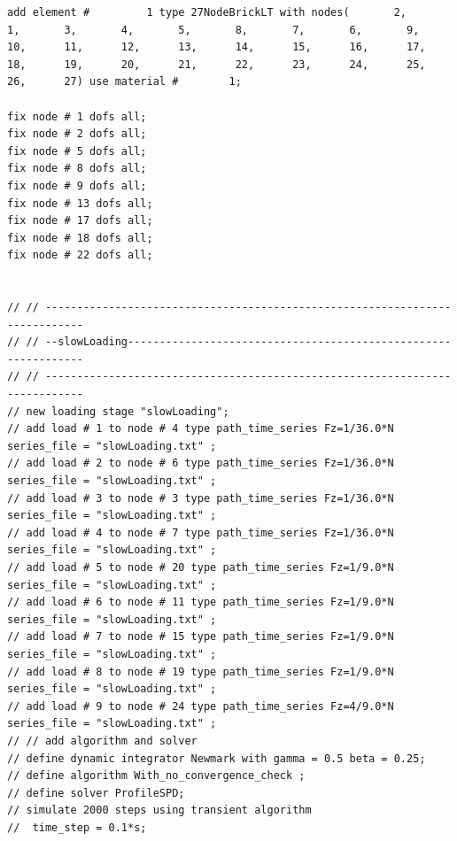 \documentclass[fleqn,11pt]{article}
\begin{document}
\begin{lstlisting}
add element #         1 type 27NodeBrickLT with nodes(       2,       1,       3,       4,       5,       8,       7,       6,       9,      10,      11,      12,      13,      14,      15,      16,      17,      18,      19,      20,      21,      22,      23,      24,      25,      26,      27) use material #        1; 

fix node # 1 dofs all;
fix node # 2 dofs all;
fix node # 5 dofs all;
fix node # 8 dofs all;
fix node # 9 dofs all;
fix node # 13 dofs all;
fix node # 17 dofs all;
fix node # 18 dofs all;
fix node # 22 dofs all;

  
// // ----------------------------------------------------------------------------
// // --slowLoading---------------------------------------------------------------
// // ----------------------------------------------------------------------------
// new loading stage "slowLoading";
// add load # 1 to node # 4 type path_time_series Fz=1/36.0*N series_file = "slowLoading.txt" ; 
// add load # 2 to node # 6 type path_time_series Fz=1/36.0*N series_file = "slowLoading.txt" ; 
// add load # 3 to node # 3 type path_time_series Fz=1/36.0*N series_file = "slowLoading.txt" ; 
// add load # 4 to node # 7 type path_time_series Fz=1/36.0*N series_file = "slowLoading.txt" ; 
// add load # 5 to node # 20 type path_time_series Fz=1/9.0*N series_file = "slowLoading.txt" ; 
// add load # 6 to node # 11 type path_time_series Fz=1/9.0*N series_file = "slowLoading.txt" ; 
// add load # 7 to node # 15 type path_time_series Fz=1/9.0*N series_file = "slowLoading.txt" ; 
// add load # 8 to node # 19 type path_time_series Fz=1/9.0*N series_file = "slowLoading.txt" ; 
// add load # 9 to node # 24 type path_time_series Fz=4/9.0*N series_file = "slowLoading.txt" ; 
// // add algorithm and solver
// define dynamic integrator Newmark with gamma = 0.5 beta = 0.25;
// define algorithm With_no_convergence_check ;
// define solver ProfileSPD;
// simulate 2000 steps using transient algorithm 
//  time_step = 0.1*s;


\end{lstlisting}
\end{document}

